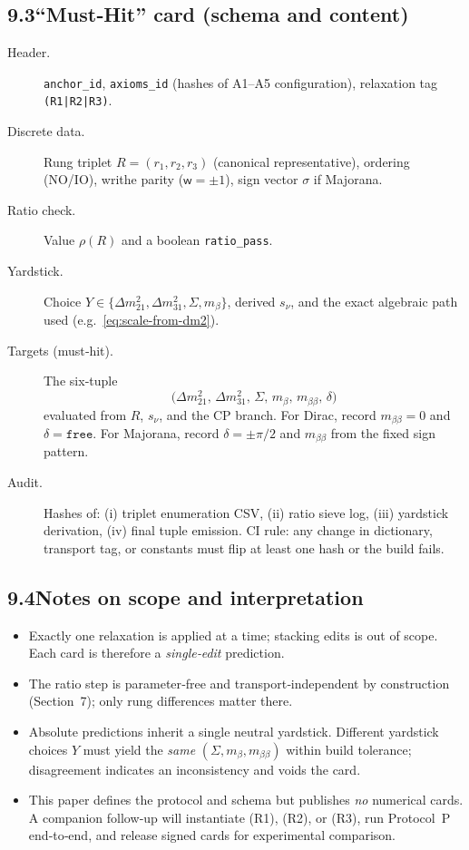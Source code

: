 \documentclass[11pt]{article}
\begin{document}
\subsection*{9.3\quad ``Must‑Hit'' card (schema and content)}

\begin{description}
  \item[Header.] \texttt{anchor\_id}, \texttt{axioms\_id} (hashes of A1–A5 configuration), relaxation tag \texttt{(R1|R2|R3)}.
  \item[Discrete data.] Rung triplet $R=(r_1,r_2,r_3)$ (canonical representative), ordering (NO/IO), writhe parity ($\mathsf{w}=\pm 1$), sign vector $\sigma$ if Majorana.
  \item[Ratio check.] Value $\rho(R)$ and a boolean \texttt{ratio\_pass}.
  \item[Yardstick.] Choice $Y\in\{\Delta m^2_{21},\Delta m^2_{31},\Sigma,m_\beta\}$, derived $s_\nu$, and the exact algebraic path used (e.g.\ \eqref{eq:scale-from-dm2}).
  \item[Targets (must‑hit).] The six‑tuple
  \[
  \bigl(\Delta m^2_{21},\,\Delta m^2_{31},\,\Sigma,\,m_\beta,\,m_{\beta\beta},\,\delta\bigr)
  \]
  evaluated from $R$, $s_\nu$, and the CP branch. For Dirac, record $m_{\beta\beta}=0$ and $\delta=\texttt{free}$. For Majorana, record $\delta=\pm\pi/2$ and $m_{\beta\beta}$ from the fixed sign pattern.
  \item[Audit.] Hashes of: (i) triplet enumeration CSV, (ii) ratio sieve log, (iii) yardstick derivation, (iv) final tuple emission. CI rule: any change in dictionary, transport tag, or constants must flip at least one hash or the build fails.
\end{description}

\subsection*{9.4\quad Notes on scope and interpretation}

\begin{itemize}
  \item Exactly one relaxation is applied at a time; stacking edits is out of scope. Each card is therefore a \emph{single‑edit} prediction.
  \item The ratio step is parameter‑free and transport‑independent by construction (Section~7); only rung differences matter there.
  \item Absolute predictions inherit a single neutral yardstick. Different yardstick choices $Y$ must yield the \emph{same} $(\Sigma,m_\beta,m_{\beta\beta})$ within build tolerance; disagreement indicates an inconsistency and voids the card.
  \item This paper defines the protocol and schema but publishes \emph{no} numerical cards. A companion follow‑up will instantiate (R1), (R2), or (R3), run Protocol~P end‑to‑end, and release signed cards for experimental comparison.
\end{itemize}
\end{document}
